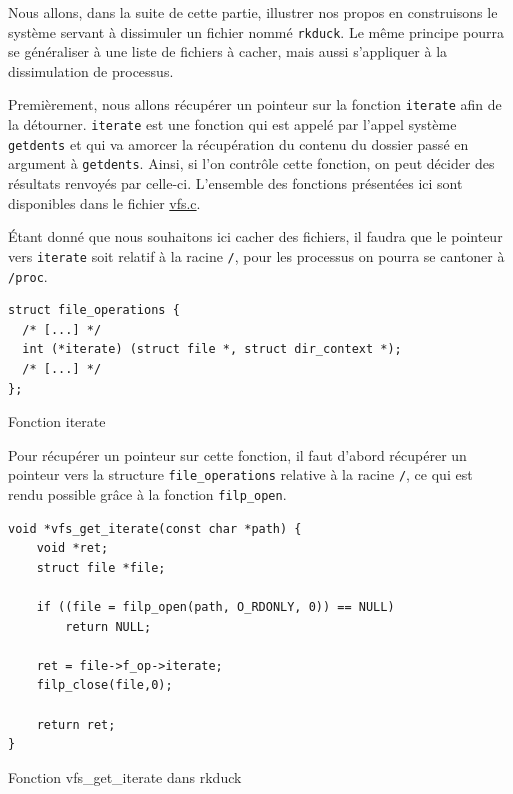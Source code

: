 \documentclass[12pt]{article}
\begin{document}
        Nous allons, dans la suite de cette partie, illustrer nos propos en construisons le système servant à dissimuler un fichier nommé \texttt{rkduck}. Le même principe pourra se généraliser à une liste de fichiers à cacher, mais aussi s'appliquer à la dissimulation de processus. 

        Premièrement, nous allons récupérer un pointeur sur la fonction \texttt{iterate} afin de la détourner. \texttt{iterate} est une fonction qui est appelé par l'appel système \texttt{getdents} et qui va amorcer la récupération du contenu du dossier passé en argument à \texttt{getdents}. Ainsi, si l'on contrôle cette fonction, on peut décider des résultats renvoyés par celle-ci. L'ensemble des fonctions présentées ici sont disponibles dans le fichier \href{https://github.com/QuokkaLight/rkduck/blob/master/rkduck/vfs.c}{vfs.c}.

        Étant donné que nous souhaitons ici cacher des fichiers, il faudra que le pointeur vers \texttt{iterate} soit relatif à la racine \texttt{/}, pour les processus on pourra se cantoner à \texttt{/proc}. \\

\begin{listing}[H]
\begin{verbatim}
struct file_operations {
  /* [...] */
  int (*iterate) (struct file *, struct dir_context *);
  /* [...] */
};
\end{verbatim}
\caption{Fonction iterate}
\label{listing:3}
\end{listing}

        Pour récupérer un pointeur sur cette fonction, il faut d'abord récupérer un pointeur vers la structure \texttt{file\_operations} relative à la racine \texttt{/}, ce qui est rendu possible grâce à la fonction \texttt{filp\_open}.\\

\begin{listing}[H]
\begin{verbatim}
void *vfs_get_iterate(const char *path) {
    void *ret;
    struct file *file;

    if ((file = filp_open(path, O_RDONLY, 0)) == NULL)
        return NULL;

    ret = file->f_op->iterate;
    filp_close(file,0);

    return ret;
}
\end{verbatim}
\caption{Fonction vfs\_get\_iterate dans rkduck}
\label{listing:3}
\end{listing}
\end{document}
